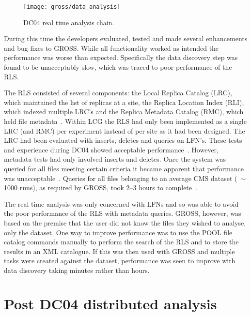 \begin{figure}[tbp]
  \centering
  \texttt{[image: gross/data\_analysis]}
  \caption{DC04 real time analysis chain.~\cite{citeulike:621630}
  \label{fig:dc04_analysis}}
\end{figure}

During this time the developers evaluated, tested and made several enhancements and bug fixes to GROSS. While all functionality worked as intended the performance was worse than expected. Specifically the data discovery step was found to be unacceptably slow, which was traced to poor performance of the RLS. 

The RLS consisted of several components: the Local Replica Catalog (LRC), which maintained the list of replicas at a site, the Replica Location Index (RLI), which indexed multiple LRC's and the Replica Metadata Catalog (RMC), which held file metadata~\cite{citeulike:623288}. Within LCG the RLS had only been implemented as a single LRC (and RMC) per experiment instead of per site as it had been designed. The LRC had been evaluated with inserts, deletes and queries on LFN's. These tests and experience during DC04 showed acceptable performance~\cite{citeulike:623294, baud2004eld}. However, metadata tests had only involved inserts and deletes. Once the system was queried for all files meeting certain criteria it became apparent that performance was unacceptable~\cite{citeulike:623294, baud2004eld}. Queries for all files belonging to an average CMS dataset ($~\sim$1000 runs), as required by GROSS, took 2--3 hours to complete~\cite{citeulike:623294}.

The real time analysis was only concerned with LFNs and so was able to avoid the poor performance of the RLS with metadata queries. GROSS, however, was based on the premise that the user did not know the files they wished to analyse, only the dataset. One way to improve performance was to use the POOL file catalog commands manually to perform the search of the RLS and to store the results in an XML catalogue. If this was then used with GROSS and multiple tasks were created against the dataset, performance was seen to improve with data discovery taking minutes rather than hours.


\section{Post DC04 distributed analysis}

